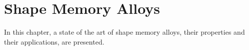 \chapter{Shape Memory Alloys}
In this chapter, a state of the art of shape memory alloys, their properties and their applications, are presented.
